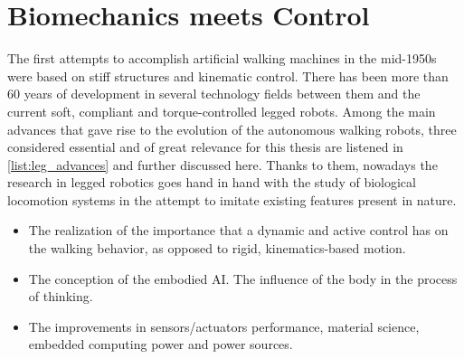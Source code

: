 
\section{Biomechanics meets Control} %
\label{sec:biomechanics_vs_control}
The first attempts to accomplish artificial walking machines in the mid-1950s were based on stiff structures and kinematic control.
There has been more than 60 years of development in several technology fields between them and the current soft, compliant and torque-controlled legged robots.
Among the main advances that gave rise to the evolution of the autonomous walking robots, three considered essential and of great relevance for this thesis are listened in \ref{list:leg_advances} and further discussed here.
Thanks to them, nowadays the research in legged robotics goes hand in hand with the study of biological locomotion systems in the attempt to imitate existing features present in nature.

\begin{itemize}
\label{list:leg_advances}
	\item The realization of the importance that a dynamic and active control has on the walking behavior, as opposed to rigid, kinematics-based motion.
	\item The conception of the embodied AI. The influence of the body in the process of thinking.
	\item The improvements in sensors/actuators performance, material science, embedded computing power and power sources.
\end{itemize}

